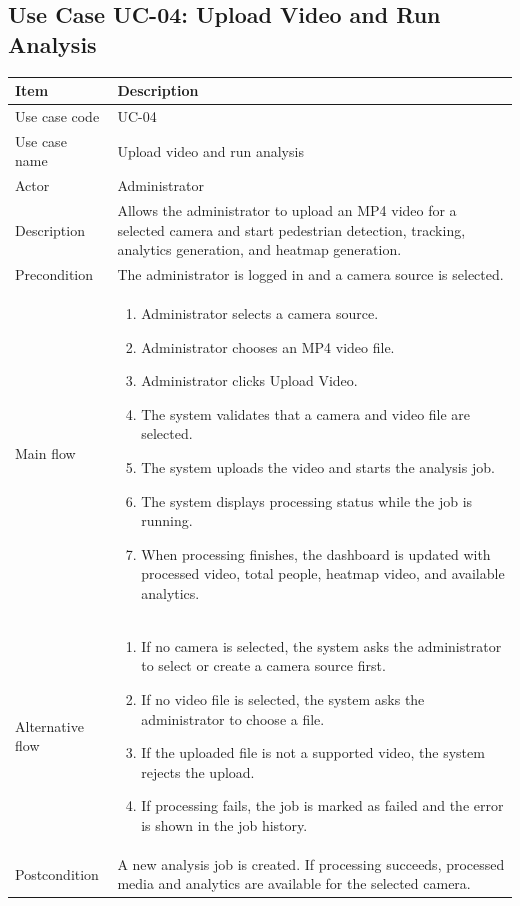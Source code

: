 \documentclass[12pt,a4paper]{report}
\begin{document}
\subsection{Use Case UC-04: Upload Video and Run Analysis}
\begin{longtable}{|p{3.6cm}|p{10.4cm}|}
\hline
\rowcolor{HeaderBlue}\textbf{Item} & \textbf{Description} \\
\hline
Use case code & UC-04 \\
\hline
Use case name & Upload video and run analysis \\
\hline
Actor & Administrator \\
\hline
Description & Allows the administrator to upload an MP4 video for a selected camera and start pedestrian detection, tracking, analytics generation, and heatmap generation. \\
\hline
Precondition & The administrator is logged in and a camera source is selected. \\
\hline
Main flow &
\begin{enumerate}
    \item Administrator selects a camera source.
    \item Administrator chooses an MP4 video file.
    \item Administrator clicks Upload Video.
    \item The system validates that a camera and video file are selected.
    \item The system uploads the video and starts the analysis job.
    \item The system displays processing status while the job is running.
    \item When processing finishes, the dashboard is updated with processed video, total people, heatmap video, and available analytics.
\end{enumerate} \\
\hline
Alternative flow &
\begin{enumerate}
    \item If no camera is selected, the system asks the administrator to select or create a camera source first.
    \item If no video file is selected, the system asks the administrator to choose a file.
    \item If the uploaded file is not a supported video, the system rejects the upload.
    \item If processing fails, the job is marked as failed and the error is shown in the job history.
\end{enumerate} \\
\hline
Postcondition & A new analysis job is created. If processing succeeds, processed media and analytics are available for the selected camera. \\
\hline
\end{longtable}
\end{document}
